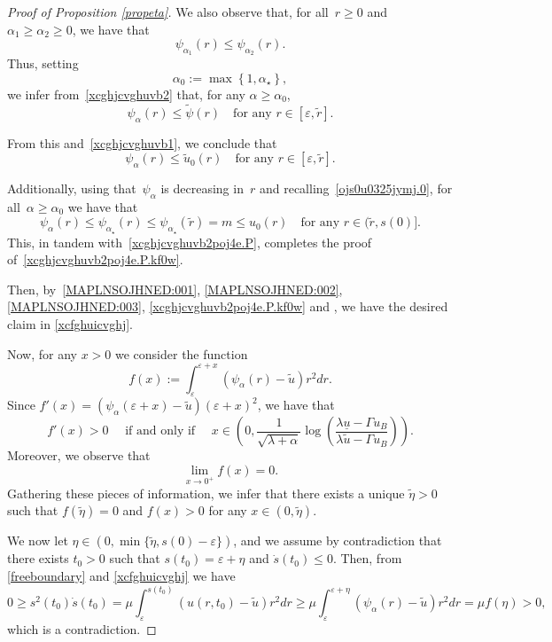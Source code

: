 \documentclass[12pt,a4paper,intlimits,sumlimits]{amsart}
\theoremstyle{definition}
\theoremstyle{plain}
\numberwithin{equation}{section}
\renewcommand{\leq}{\leqslant}
\renewcommand{\le}{\leqslant}
\renewcommand{\ge}{\geqslant}
\begin{document}
\begin{proof}[Proof of Proposition \ref{propeta}]
We also observe that, for all~$r\ge0$ and~$\alpha_1\ge\alpha_2\ge0$, we have that\begin{equation}\label{ojs0u0325jymj.0}
\psi_{\alpha_1}(r)\leq\psi_{\alpha_2}(r).\end{equation}  
Thus, setting
\[
\alpha_0:=\max\left\{1, \alpha_\star \right\},
\]
we infer from~\eqref{xcghjcvghuvb2} that, for any $\alpha\ge \alpha_0$,
$$ \psi_{\alpha}(r)\leq \widetilde \psi (r) \quad \mbox{for any }r\in [\varepsilon, \widetilde r].$$

{F}rom this and~\eqref{xcghjcvghuvb1}, we conclude that
\begin{equation}\label{xcghjcvghuvb2poj4e.P} \psi_{\alpha}(r)\leq \widetilde u_0 (r) \quad \mbox{for any }r\in [\varepsilon, \widetilde r].\end{equation}

Additionally, using that~$\psi_\alpha$ is decreasing in~$r$ and recalling~\eqref{ojs0u0325jymj.0},
for all~$\alpha\ge\alpha_0$ we have that
$$\psi_\alpha(r)\le\psi_{\alpha_\star}(r)\le\psi_{\alpha_\star}(\widetilde r)
= m \leq u_0(r) \quad \mbox{for any }r\in ( \widetilde r, s(0)].$$
This, in tandem with~\eqref{xcghjcvghuvb2poj4e.P}, completes the proof of~\eqref{xcghjcvghuvb2poj4e.P.kf0w}.

Then, by~\eqref{MAPLNSOJHNED:001}, \eqref{MAPLNSOJHNED:002}, \eqref{MAPLNSOJHNED:003},
\eqref{xcghjcvghuvb2poj4e.P.kf0w} and \cite[Corollary~2.5]{MR1465184}, we have the desired claim in \eqref{xcfghuicvghj}.

Now, for any $x>0$ we consider the function 
\[
f(x):=\int_\varepsilon^{\varepsilon+x}(\psi_\alpha(r)-\widetilde u)r^2dr.
\]
Since $f'(x)=(\psi_\alpha(\varepsilon+x)-\widetilde u)(\varepsilon+x)^2$, we have that
\[
f'(x)>0 \quad \mbox{ if and only if } \quad x\in \left(0, \frac{1}{\sqrt{\lambda+\alpha}}\log\left(\frac{\lambda \underline u-\Gamma u_B}{\lambda \widetilde u-\Gamma u_B}\right)\right).
\]
Moreover, we observe that
\[
\lim_{x\to 0^+}f(x)=0.
\] 
Gathering these pieces of information, we infer that there exists a unique $\widetilde \eta>0$ such that $f(\widetilde \eta)=0$ and $f(x)>0$ for any $x\in (0,\widetilde \eta)$.

We now let $\eta \in (0,\min\{\widetilde \eta,s(0)-\varepsilon\})$, and we assume by contradiction that there exists $t_0>0$ such that $s(t_0)=\varepsilon+\eta$ and $\dot s(t_0)\leq 0$.
Then, from \eqref{freeboundary} and \eqref{xcfghuicvghj} we have 
\[
0\ge s^2(t_0)\dot s(t_0)=\mu \int_\varepsilon^{s(t_0)}(u(r,t_0)-\widetilde u)r^2dr\ge \mu\int_\varepsilon^{\varepsilon+\eta}(\psi_\alpha(r)-\widetilde u)r^2dr= \mu f(\eta)>0,
\]
which is a contradiction.
\end{proof}
\end{document}
